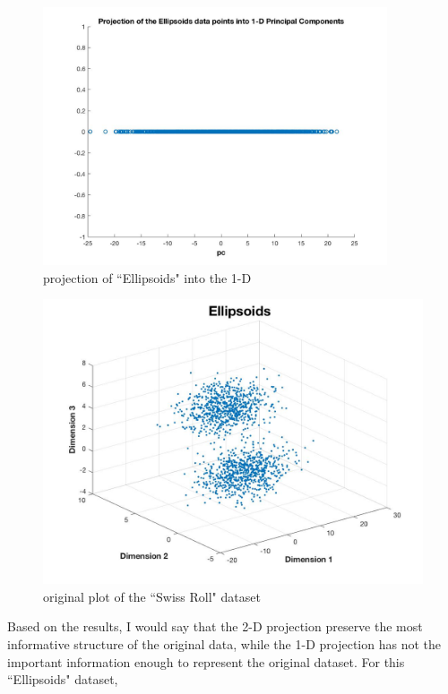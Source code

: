 \documentclass[a4paper]{article}
\begin{document}
\begin{spacing}{2.0}
\begin{enumerate}[-]
\begin{figure}[H]
\begin{minipage}[t]{0.5\textwidth}
	      \includegraphics[width=4in]{3_1.jpg}
	      \caption{projection of ``Ellipsoids" into the 1-D}
	      \label{fig:side:b}
	    \end{minipage}
	  \end{figure}
	  
	\begin{figure}[H]
	      \centering
	      \includegraphics[width = 4.5in]{3_0.jpg}
	      \caption{original plot of the ``Swiss Roll" dataset}
	  \end{figure}
	Based on the results, I would say that the 2-D projection preserve the most informative structure of the original data, while the 1-D projection has not the important information enough to represent the original dataset. For this ``Ellipsoids" dataset,  
	 \end{enumerate}

	 
	
\end{spacing}
\end{document}
